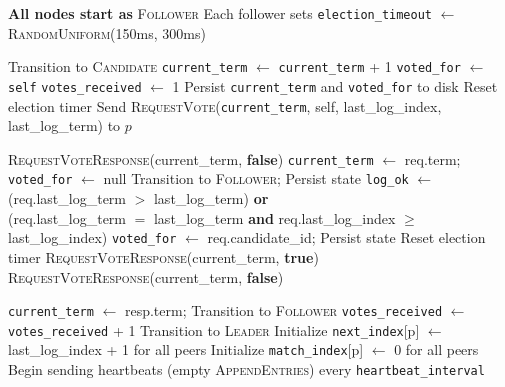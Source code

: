\documentclass[12pt,a4paper]{article}
\begin{document}
\begin{algorithm}
\caption{Raft Leader Election}
\begin{algorithmic}[1]
\State \textbf{All nodes start as} \textsc{Follower}
\State Each follower sets \texttt{election\_timeout} $\leftarrow$ \textsc{RandomUniform}(150ms, 300ms)

 
  \State Transition to \textsc{Candidate}
  \State \texttt{current\_term} $\leftarrow$ \texttt{current\_term} + 1
  \State \texttt{voted\_for} $\leftarrow$ \texttt{self}
  \State \texttt{votes\_received} $\leftarrow$ 1 
  \State Persist \texttt{current\_term} and \texttt{voted\_for} to disk
  \State Reset election timer
    \State Send \textsc{RequestVote}(\texttt{current\_term}, self, last\_log\_index, last\_log\_term) to $p$
  \EndFor
\EndProcedure

    \State \Return \textsc{RequestVoteResponse}(current\_term, \textbf{false})
  \EndIf
    \State \texttt{current\_term} $\leftarrow$ req.term; \texttt{voted\_for} $\leftarrow$ null
    \State Transition to \textsc{Follower}; Persist state
  \EndIf
  \State \texttt{log\_ok} $\leftarrow$ (req.last\_log\_term $>$ last\_log\_term) \textbf{or}\\
  \hspace{3.8cm}(req.last\_log\_term $=$ last\_log\_term \textbf{and} req.last\_log\_index $\geq$ last\_log\_index)
    \State \texttt{voted\_for} $\leftarrow$ req.candidate\_id; Persist state
    \State Reset election timer
    \State \Return \textsc{RequestVoteResponse}(current\_term, \textbf{true})
  \Else
    \State \Return \textsc{RequestVoteResponse}(current\_term, \textbf{false})
  \EndIf
\EndProcedure

    \State \texttt{current\_term} $\leftarrow$ resp.term; Transition to \textsc{Follower}
  \EndIf
    \State \texttt{votes\_received} $\leftarrow$ \texttt{votes\_received} + 1
      \State Transition to \textsc{Leader}
      \State Initialize \texttt{next\_index}[p] $\leftarrow$ last\_log\_index + 1 for all peers
      \State Initialize \texttt{match\_index}[p] $\leftarrow$ 0 for all peers
      \State Begin sending heartbeats (empty \textsc{AppendEntries}) every \texttt{heartbeat\_interval}
    \EndIf
  \EndIf
\EndProcedure
\end{algorithmic}
\end{algorithm}
\end{document}
